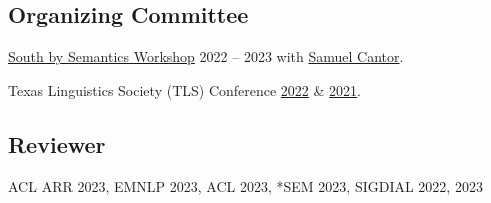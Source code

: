 \subsection{Organizing Committee}

\quad \href{https://sites.utexas.edu/sxsemantics}{South by Semantics Workshop} 2022 -- 2023 with \href{https://www.cantwolf.com}{Samuel Cantor}.

\quad Texas Linguistics Society (TLS) Conference \href{http://tls.ling.utexas.edu/2022/}{2022} \& \href{http://tls.ling.utexas.edu/2021/}{2021}.

\subsection{Reviewer}

\quad ACL ARR 2023, EMNLP 2023, ACL 2023, *SEM 2023, SIGDIAL 2022, 2023
